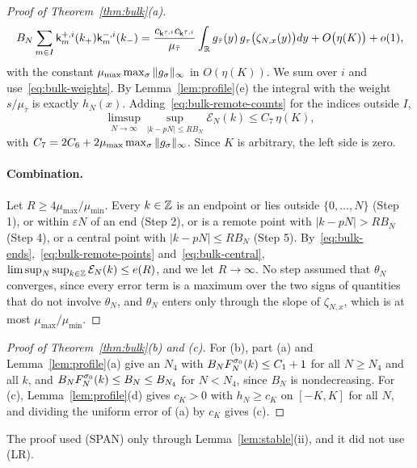 \begin{proof}[Proof of Theorem~\ref{thm:bulk}(a)]
\[
 B_N\sum_{m\in I}\mathsf k^{{+},i}_m(k_{+})\mathsf k^{{-},i}_m(k_{-})
 =\frac{c_{\mathsf k^{\tau,i}}c_{\mathsf k^{\bar\tau,i}}}{\mu_{\bar\tau}}\int_{\mathbb{R}} g_{\bar\tau}(y)\,g_\tau\bigl(\zeta_{N,x}(y)\bigr)dy
 +O\bigl(\eta(K)\bigr)+o(1),
\]
with the constant $\mu_{\max}\max_\sigma\|g_\sigma\|_\infty$ in $O(\eta(K))$. We sum over $i$
and use~\eqref{eq:bulk-weights}. By Lemma~\ref{lem:profile}(e) the integral with the
weight $s/\mu_{\bar\tau}$ is exactly $h_N(x)$. Adding~\eqref{eq:bulk-remote-counts} for
the indices outside $I$,
\begin{equation}\label{eq:bulk-central}
 \limsup_{N\to\infty}\sup_{|k-pN|\le RB_N}\mathcal E_N(k)\le C_7\,\eta(K),
\end{equation}
with $C_7=2C_6+2\mu_{\max}\max_\sigma\|g_\sigma\|_\infty$. Since $K$ is arbitrary, the left
side is zero.

\paragraph{Combination.} Let $R\ge4\mu_{\max}/\mu_{\min}$. Every $k\in\mathbb{Z}$ is an endpoint
or lies outside $\{0,\dots,N\}$ (Step 1), or within $\varepsilon N$ of an end (Step 2), or is a
remote point with $|k-pN|>RB_N$ (Step 4), or a central point with $|k-pN|\le RB_N$
(Step 5). By~\eqref{eq:bulk-ends},~\eqref{eq:bulk-remote-points}
and~\eqref{eq:bulk-central}, $\limsup_N\sup_{k\in\mathbb{Z}}\mathcal E_N(k)\le e(R)$, and we let
$R\to\infty$. No step assumed that $\theta_N$ converges, since every error term is a
maximum over the two signs of quantities that do not involve $\theta_N$, and
$\theta_N$ enters only through the slope of $\zeta_{N,x}$, which is at most
$\mu_{\max}/\mu_{\min}$.
\end{proof}

\begin{proof}[Proof of Theorem~\ref{thm:bulk}(b) and (c)]
For (b), part (a) and Lemma~\ref{lem:profile}(a) give an $N_4$ with
$B_NF^{\sigma_0}_N(k)\le C_1+1$ for all $N\ge N_4$ and all $k$, and
$B_NF^{\sigma_0}_N(k)\le B_N\le B_{N_4}$ for $N<N_4$, since $B_N$ is nondecreasing. For
(c), Lemma~\ref{lem:profile}(d) gives $c_K>0$ with $h_N\ge c_K$ on $[-K,K]$ for all $N$,
and dividing the uniform error of (a) by $c_K$ gives (c).
\end{proof}

The proof used (SPAN) only through Lemma~\ref{lem:stable}(ii), and it did not use (LR).
